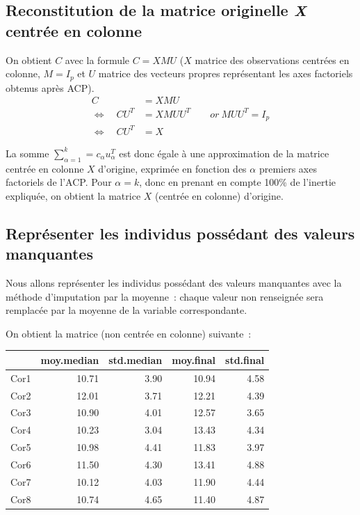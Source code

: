 \documentclass[a4paper,11pt]{report}
\begin{document}
\subsection{Reconstitution de la matrice originelle \textit{X} centrée en colonne}

On obtient $C$ avec la formule $C = XMU$ ($X$ matrice des observations centrées en colonne, $M = I_p$ et $U$ matrice des vecteurs propres représentant les axes factoriels obtenus après ACP).
\begin{align*}
C &= XMU \\
\Longleftrightarrow \quad CU^T &= XMUU^T \qquad or\ MUU^T = I_p \\
\Longleftrightarrow \quad CU^T &= X
\end{align*}



La somme $\sum\limits_{\alpha=1}^k = c_\alpha u_{\alpha}^T$ est donc égale à une approximation de la matrice centrée en colonne $X$ d'origine, exprimée en fonction des $\alpha$ premiers axes factoriels de l'ACP. Pour $\alpha = k$, donc en prenant en compte 100\% de l'inertie expliquée, on obtient la matrice $X$ (centrée en colonne) d'origine.



\subsection{Représenter les individus possédant des valeurs manquantes}

Nous allons représenter les individus possédant des valeurs manquantes avec la méthode d'imputation par la moyenne~: chaque valeur non renseignée sera remplacée par la moyenne de la variable correspondante.

On obtient la matrice (non centrée en colonne) suivante~:
\begin{table}[H]
	\centering
	\begin{tabular}{r|rrrr}
		& moy.median & std.median & moy.final & std.final \\ 
		\hline
		Cor1 & 10.71 & 3.90 & 10.94 & 4.58 \\ 
		Cor2 & 12.01 & 3.71 & 12.21 & 4.39 \\ 
		Cor3 & 10.90 & 4.01 & 12.57 & 3.65 \\ 
		Cor4 & 10.23 & 3.04 & 13.43 & 4.34 \\ 
		Cor5 & 10.98 & 4.41 & 11.83 & 3.97 \\ 
		Cor6 & 11.50 & 4.30 & 13.41 & 4.88 \\ 
		Cor7 & 10.12 & 4.03 & 11.90 & 4.44 \\ 
		Cor8 & 10.74 & 4.65 & 11.40 & 4.87 \\ 
	\end{tabular}
\end{table}
\end{document}
